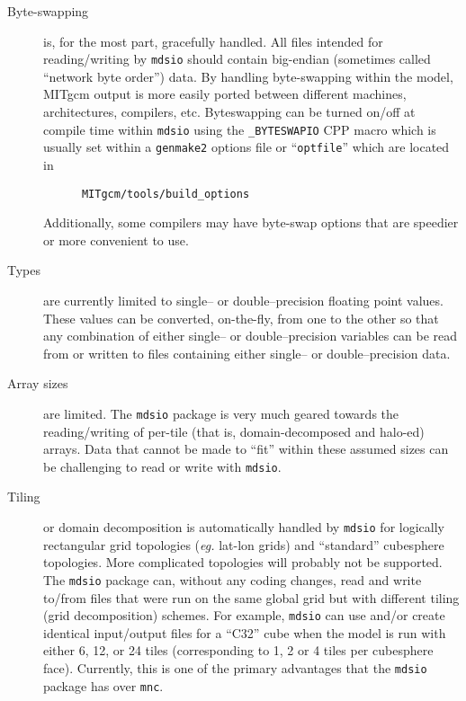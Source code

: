 \begin{description}
\item[Byte-swapping] is, for the most part, gracefully handled.  All
  files intended for reading/writing by \texttt{mdsio} should contain
  big-endian (sometimes called ``network byte order'') data.  By
  handling byte-swapping within the model, MITgcm output is more
  easily ported between different machines, architectures, compilers,
  etc.  Byteswapping can be turned on/off at compile time within
  \texttt{mdsio} using the \texttt{\_BYTESWAPIO} CPP macro which is
  usually set within a \texttt{genmake2} options file or
  ``\texttt{optfile}'' which are located in
\begin{verbatim}
      MITgcm/tools/build_options
\end{verbatim}
  Additionally, some compilers may have byte-swap options that are
  speedier or more convenient to use.

\item[Types] are currently limited to single-- or double--precision
  floating point values.  These values can be converted, on-the-fly,
  from one to the other so that any combination of either single-- or
  double--precision variables can be read from or written to files
  containing either single-- or double--precision data.

\item[Array sizes] are limited.  The \texttt{mdsio} package is very
  much geared towards the reading/writing of per-tile (that is,
  domain-decomposed and halo-ed) arrays.  Data that cannot be made to
  ``fit'' within these assumed sizes can be challenging to read or
  write with \texttt{mdsio}.

\item[Tiling] or domain decomposition is automatically handled by
  \texttt{mdsio} for logically rectangular grid topologies
  (\textit{eg.} lat-lon grids) and ``standard'' cubesphere topologies.
  More complicated topologies will probably not be supported.  The
  \texttt{mdsio} package can, without any coding changes, read and
  write to/from files that were run on the same global grid but with
  different tiling (grid decomposition) schemes.  For example,
  \texttt{mdsio} can use and/or create identical input/output files
  for a ``C32'' cube when the model is run with either 6, 12, or 24
  tiles (corresponding to 1, 2 or 4 tiles per cubesphere face).
  Currently, this is one of the primary advantages that the
  \texttt{mdsio} package has over \texttt{mnc}.


\end{description}
